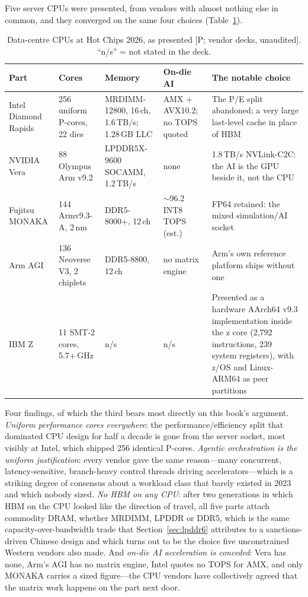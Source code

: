 Five server CPUs were presented, from vendors with almost nothing else in common, and they converged on the same four choices (Table~\ref{tab:hc-cpu}).

\begin{table}[htbp]
  \centering
  \scriptsize
  \setlength{\tabcolsep}{3pt}
  \caption{Data-centre CPUs at Hot Chips 2026, as presented [P; vendor decks, unaudited]. ``n/s'' = not stated in the deck.}
  \label{tab:hc-cpu}
  \begin{tabular}{p{20mm}p{25mm}p{29mm}p{24mm}p{36mm}}
    \toprule
    Part & Cores & Memory & On-die AI & The notable choice \\
    \midrule
    Intel Diamond Rapids & 256 uniform P-cores, 22 dies & MRDIMM-12800, 16\,ch, 1.6\,TB/s; 1.28\,GB LLC & AMX + AVX10.2; no TOPS quoted & The P/E split abandoned; a very large last-level cache in place of HBM \\
    \addlinespace
    NVIDIA Vera & 88 Olympus Arm v9.2 & LPDDR5X-9600 SOCAMM, 1.2\,TB/s & none & 1.8\,TB/s NVLink-C2C: the AI is the GPU beside it, not the CPU \\
    \addlinespace
    Fujitsu MONAKA & 144 Armv9.3-A, 2\,nm & DDR5-8000+, 12\,ch & ${\sim}96.2$ INT8 TOPS (est.) & FP64 retained: the mixed simulation/AI socket \\
    \addlinespace
    Arm AGI & 136 Neoverse V3, 2 chiplets & DDR5-8800, 12\,ch & no matrix engine & Arm's own reference platform ships without one \\
    \addlinespace
    IBM Z & 11 SMT-2 cores, 5.7+\,GHz & n/s & n/s & Presented as a hardware AArch64 v9.3 implementation inside the z core (2,792 instructions, 239 system registers), with z/OS and Linux-ARM64 as peer partitions~\cite{hc2026} \\
    \bottomrule
  \end{tabular}
\end{table}

Four findings, of which the third bears most directly on this book's argument. \emph{Uniform performance cores everywhere}: the performance/efficiency split that dominated CPU design for half a decade is gone from the server socket, most visibly at Intel, which shipped 256 identical P-cores. \emph{Agentic orchestration is the uniform justification}: every vendor gave the same reason---many concurrent, latency-sensitive, branch-heavy control threads driving accelerators---which is a striking degree of consensus about a workload class that barely existed in 2023 and which nobody sized. \emph{No HBM on any CPU}: after two generations in which HBM on the CPU looked like the direction of travel, all five parts attach commodity DRAM, whether MRDIMM, LPDDR or DDR5, which is the same capacity-over-bandwidth trade that Section~\ref{sec:lpddr6} attributes to a sanctions-driven Chinese design and which turns out to be the choice five unconstrained Western vendors also made. And \emph{on-die AI acceleration is conceded}: Vera has none, Arm's AGI has no matrix engine, Intel quotes no TOPS for AMX, and only MONAKA carries a sized figure---the CPU vendors have collectively agreed that the matrix work happens on the part next door.

